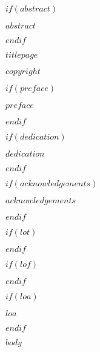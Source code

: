 \documentclass[12pt,twoside,openany,\mydriver]{thesis}  %
\renewcommand{\baselinestretch}{2}
\begin{document}
\pagestyle{empty} %

$if(abstract)$
  \begin{abstract1}
    $abstract$
  \end{abstract1}
$endif$

\begin{titlepage1}
    $titlepage$
\end{titlepage1}

\begin{copyright1}
    $copyright$
\end{copyright1}

\pagestyle{plain}  \setcounter{page}{2}

$if(preface)$
  \begin{preface}
    $preface$
  \end{preface}
$endif$

$if(dedication)$
  \begin{dedication}
    $dedication$
  \end{dedication}
$endif$

$if(acknowledgements)$
  \begin{acknowledgements}
    $acknowledgements$
  \end{acknowledgements}
$endif$

\cleardoublepage
{}
{}
\renewcommand{\contentsname}{Table of Contents}
\renewcommand{\baselinestretch}{1}
\small\normalsize
\tableofcontents

$if(lot)$
  \cleardoublepage
  \renewcommand{\contentsname}{List of Tables}
  \listoftables
$endif$

$if(lof)$
  \newpage
  \renewcommand{\contentsname}{List of Figures}
  \listoffigures
$endif$

$if(loa)$
  \newpage
  \begin{loa}
    $loa$
  \end{loa}
$endif$

\newpage
\setlength{\parskip}{0em}
\renewcommand{\baselinestretch}{2}
\small\normalsize

\setcounter{page}{1}

$body$
\end{document}
